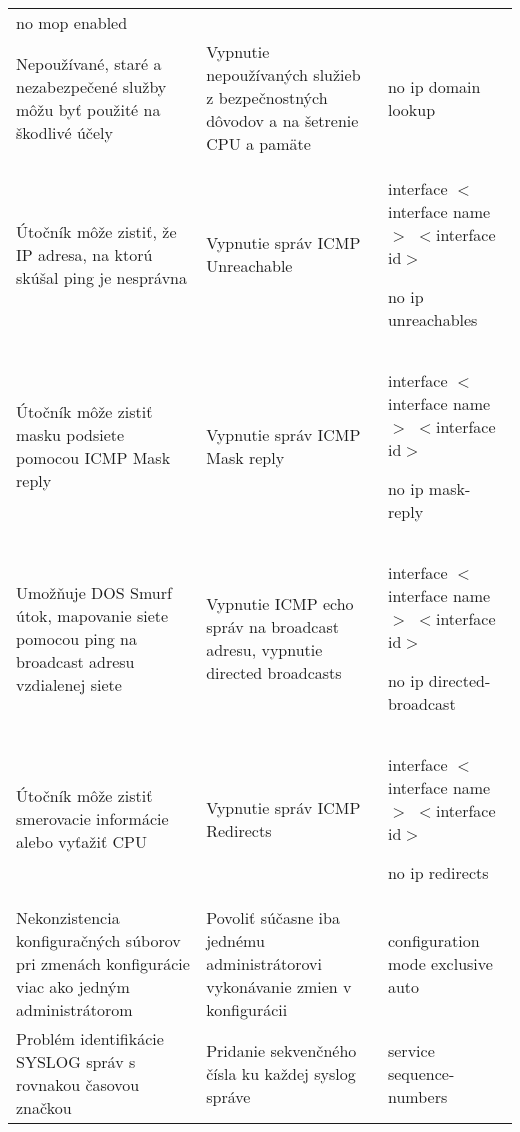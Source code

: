 \begin{longtable}[!htbp]{|L{10em}L{10em}>{\selectfont}L{34em}|}
	\hspace{0.5em} no mop enabled\\
	
	
	
	Nepoužívané, staré a nezabezpečené služby môžu byť použité na škodlivé účely	&Vypnutie nepoužívaných služieb z bezpečnostných dôvodov a na šetrenie CPU a pamäte 	&no ip domain lookup\\
	
	
	
	 Útočník môže zistiť, že IP adresa, na ktorú skúšal ping je nesprávna	&Vypnutie správ ICMP Unreachable	&interface $<$interface name$>$ $<$interface id$>$
	
	\hspace{0.5em}no ip unreachables\\
	
	
	
	
	Útočník môže zistiť masku podsiete pomocou ICMP Mask reply	&Vypnutie správ ICMP Mask reply	&interface $<$interface name$>$ $<$interface id$>$
	
	\hspace{0.5em}no ip mask-reply\\
	
	
	
	
	 Umožňuje DOS Smurf útok, mapovanie siete pomocou ping na broadcast adresu vzdialenej siete	&Vypnutie ICMP echo správ na broadcast adresu, vypnutie directed broadcasts	&interface $<$interface name$>$ $<$interface id$>$
	
	\hspace{0.5em}no ip directed-broadcast\\
	
	
	
	
	Útočník môže zistiť smerovacie informácie alebo vyťažiť CPU	&Vypnutie správ ICMP Redirects	&interface $<$interface name$>$ $<$interface id$>$
	
	\hspace{0.5em}no ip redirects\\
	
	
	
	 Nekonzistencia konfiguračných súborov pri zmenách konfigurácie viac ako jedným administrátorom	&Povoliť súčasne iba jednému administrátorovi vykonávanie zmien v konfigurácii	&configuration mode exclusive auto\\
	
	
	
	
	Problém identifikácie SYSLOG správ s rovnakou časovou značkou	&Pridanie sekvenčného čísla ku každej syslog správe	&service sequence-numbers\\
	

\end{longtable}
